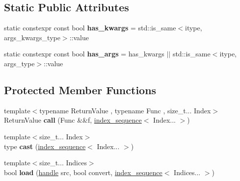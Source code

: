 \subsection*{Static Public Attributes}
\begin{DoxyCompactItemize}
\item 
static constexpr const bool {\bfseries has\+\_\+kwargs} = std\+::is\+\_\+same$<$itype, args\+\_\+kwargs\+\_\+type$>$\+::value\hypertarget{classtype__caster_3_01std_1_1tuple_3_01_tuple_8_8_8_01_4_01_4_a818931299c5a8efc9afb9c7d771446ae}{}\label{classtype__caster_3_01std_1_1tuple_3_01_tuple_8_8_8_01_4_01_4_a818931299c5a8efc9afb9c7d771446ae}

\item 
static constexpr const bool {\bfseries has\+\_\+args} = has\+\_\+kwargs $\vert$$\vert$ std\+::is\+\_\+same$<$itype, args\+\_\+type$>$\+::value\hypertarget{classtype__caster_3_01std_1_1tuple_3_01_tuple_8_8_8_01_4_01_4_af8a97855d04bea00f33af6105674bfc2}{}\label{classtype__caster_3_01std_1_1tuple_3_01_tuple_8_8_8_01_4_01_4_af8a97855d04bea00f33af6105674bfc2}

\end{DoxyCompactItemize}
\subsection*{Protected Member Functions}
\begin{DoxyCompactItemize}
\item 
{\footnotesize template$<$typename Return\+Value , typename Func , size\+\_\+t... Index$>$ }\\Return\+Value {\bfseries call} (Func \&\&f, \hyperlink{structindex__sequence}{index\+\_\+sequence}$<$ Index... $>$)\hypertarget{classtype__caster_3_01std_1_1tuple_3_01_tuple_8_8_8_01_4_01_4_a92ed6fb0a5a5663845bbc73e10ec4acc}{}\label{classtype__caster_3_01std_1_1tuple_3_01_tuple_8_8_8_01_4_01_4_a92ed6fb0a5a5663845bbc73e10ec4acc}

\item 
{\footnotesize template$<$size\+\_\+t... Index$>$ }\\type {\bfseries cast} (\hyperlink{structindex__sequence}{index\+\_\+sequence}$<$ Index... $>$)\hypertarget{classtype__caster_3_01std_1_1tuple_3_01_tuple_8_8_8_01_4_01_4_a3812fda7ad2fec8754fad18b0ca77ddb}{}\label{classtype__caster_3_01std_1_1tuple_3_01_tuple_8_8_8_01_4_01_4_a3812fda7ad2fec8754fad18b0ca77ddb}

\item 
{\footnotesize template$<$size\+\_\+t... Indices$>$ }\\bool {\bfseries load} (\hyperlink{classhandle}{handle} src, bool convert, \hyperlink{structindex__sequence}{index\+\_\+sequence}$<$ Indices... $>$)\hypertarget{classtype__caster_3_01std_1_1tuple_3_01_tuple_8_8_8_01_4_01_4_a63d86781d6b90ffc4b2387d5c343986c}{}\label{classtype__caster_3_01std_1_1tuple_3_01_tuple_8_8_8_01_4_01_4_a63d86781d6b90ffc4b2387d5c343986c}

\end{DoxyCompactItemize}
